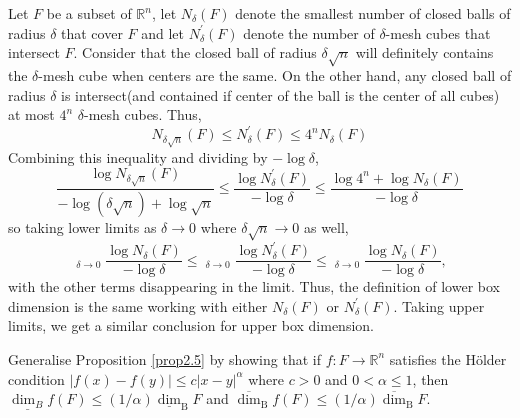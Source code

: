 \documentclass[12pt, a4paper]{article}
\DeclareMathOperator*\lowlim{\underline{lim}}
\begin{document}
\begin{customsol}{2.1}
    Let $F$ be a subset of $\mathbb{R}^{n}$, let $N_{\delta}(F)$ denote the smallest number of closed balls of radius $\delta$ that cover $F$ and let $N_{\delta}^{\prime}(F)$ denote the number of $\delta$-mesh cubes that intersect $F$. 
    Consider that the closed ball of radius $\delta\sqrt{n}$ will definitely contains the $\delta$-mesh cube when centers are the same. On the other hand, any closed ball of radius $\delta$ is intersect(and contained if center of the ball is the center of all cubes) at most $4^n$ $\delta$-mesh cubes. Thus, 
    $$
    N_{\delta \sqrt{n}}(F) \leq N_{\delta}^{\prime}(F) \leq 4^{n} N_{\delta}(F)
    $$
    Combining this inequality and dividing by $-\log \delta$,
$$
\frac{\log N_{\delta \sqrt{n}}(F)}{-\log (\delta \sqrt{n})+\log \sqrt{n}} \leq \frac{\log N_{\delta}^{\prime}(F)}{-\log \delta} \leq \frac{\log 4^{n}+\log N_{\delta}(F)}{-\log \delta}
$$
so taking lower limits as $\delta \rightarrow 0$ where $\delta\sqrt{n}\rightarrow 0 $ as well,
$$
\lowlim _{\delta \rightarrow 0} \frac{\log N_{\delta}(F)}{-\log \delta} \leq \lowlim _{\delta \rightarrow 0} \frac{\log N_{\delta}^{\prime}(F)}{-\log \delta} \leq \lowlim _{\delta \rightarrow 0} \frac{\log N_{\delta}(F)}{-\log \delta},
$$
with the other terms disappearing in the limit. Thus, the definition of lower box dimension is the same working with either $N_{\delta}(F)$ or $N_{\delta}^{\prime}(F)$. Taking upper limits, we get a similar conclusion for upper box dimension.
\end{customsol}


\begin{customexercise}{2.2}
    Generalise Proposition \ref{prop2.5} by showing that if $f: F \rightarrow \mathbb{R}^{n}$ satisfies the Hölder condition $|f(x)-f(y)| \leq c|x-y|^{\alpha}$ where $c>0$ and $0<\alpha \leq 1$, then $\underline{\operatorname{dim}_{B}} f(F) \leq(1 / \alpha) \underline{\operatorname{dim}}_{\mathrm{B}} F$ and $\overline{\operatorname{dim}}_{\mathrm{B}} f(F) \leq(1 / \alpha) \overline{\operatorname{dim}}_{\mathrm{B}} F$.
\end{customexercise}
\end{document}
